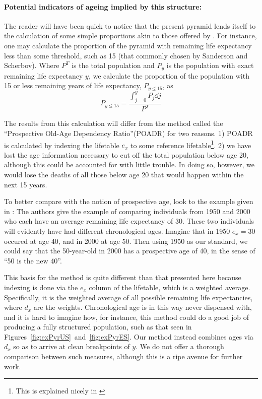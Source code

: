 \paragraph{Potential indicators of ageing implied by this structure: }

The reader will have been quick to notice that the present pyramid lends itself
to the calculation of some simple proportions akin to those offered by
\citet[e.g.][]{sanderson2005average}. For instance, one may calculate the
proportion of the pyramid with remaining life expectancy less than some
threshold, such as 15 (that commonly chosen by Sanderson and Scherbov). Where
$P^T$ is the total population and $P_y$ is the population with exact remaining
life expectancy $y$, we calculate the proportion of the population with 15 or
less remaining years of life expectancy, $P_{y \le 15}$, as
\begin{equation}
P_{y \le 15} = \frac{\int _{j=0}^{y} P_j \dd j}{P^T}
\end{equation}

The results from this calculation will differ from the method called the
``Prospective Old-Age Dependency Ratio''(POADR) for two reasons. 1) POADR is
calculated by indexing the lifetable $e_x$ to some reference
lifetable\footnote{This is explained nicely in \citet{sanderson2007new}}. 2)
we have lost the age information necessary to cut off the total population
below age 20, although this could be accounted for with little trouble. In
doing so, however, we would lose the deaths of all those below age 20 that
would happen within the next 15 years. 

To better compare with the notion of prospective age, look to the example given
in \citet{sanderson2007new}: The authors give the example of comparing
individuals from 1950 and 2000 who each have an average remaining life 
expectancy of 30. These two individuals will 
evidently have had different chronological ages. Imagine that in 1950 $e_x = 30$ 
occured at age 40, and in 2000 at age 50. Then using 1950 as our standard, we 
could say that the 50-year-old in 2000 has a prospective age of 40, in the sense
of ``50 is the new 40''. 

This basis for the method is quite different than that presented here because
indexing is done via the $e_x$ column of the lifetable, which is a weighted
average. Specifically, it is the weighted average of all possible remaining life
expectancies, where $d_x$ are the weights. Chronological age is in this way
never dispensed with, and it is hard to imagine how, for instance, this method
could do a good job of producing a fully structured population, such as that
seen in Figures~\ref{fig:exPyrUS}~and~\ref{fig:exPyrES}. Our method instead
combines ages via $d_x$ so as to arrive at clean breakpoints of $y$. We do not
offer a thorough comparison between such measures, although this is a ripe
avenue for further work.

